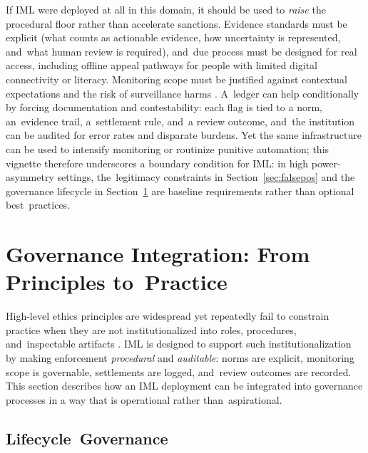 \documentclass[mca,article,accept,pdftex,oneauthor]{Definitions/mdpi}
\begin{document}
If IML were deployed at all in this domain, it should be used to \emph{raise} the procedural floor rather than accelerate sanctions. Evidence standards must be explicit (what counts as actionable evidence, how uncertainty is represented, and~what human review is required), and~due process must be designed for real access, including offline appeal pathways for people with limited digital connectivity or literacy. Monitoring scope must be justified against contextual expectations and the risk of surveillance harms \citep{Lyon2007Surveillance}. A~ledger can help conditionally by forcing documentation and contestability: each flag is tied to a norm, an~evidence trail, a~settlement rule, and~a review outcome, and~the institution can be audited for error rates and disparate burdens. Yet the same infrastructure can be used to intensify monitoring or routinize punitive automation; this vignette therefore underscores a boundary condition for IML: in high power-asymmetry settings, the~legitimacy constraints in Section~\ref{sec:falsepos} and the governance lifecycle in Section~\ref{sec:governance} are baseline requirements rather than optional best~practices.


\section{Governance Integration: From Principles to~Practice}
\label{sec:governance}

High-level ethics principles are widespread yet repeatedly fail to constrain practice when they are not institutionalized into roles, procedures, and~inspectable artifacts \citep{Jobin2019EthicsGuidelines,Mittelstadt2019Principles}. IML is designed to support such institutionalization by making enforcement \emph{procedural} and \emph{auditable}: norms are explicit, monitoring scope is governable, settlements are logged, and~review outcomes are recorded. This section describes how an IML deployment can be integrated into governance processes in a way that is operational rather than~aspirational.

\subsection{Lifecycle~Governance}
\end{document}
